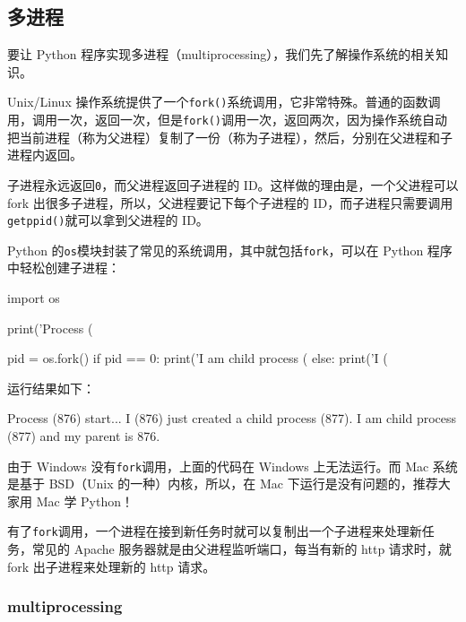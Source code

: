 \hypertarget{ux591aux8fdbux7a0b}{%
\subsection{多进程}\label{ux591aux8fdbux7a0b}}

要让 Python
程序实现多进程（multiprocessing），我们先了解操作系统的相关知识。

Unix/Linux
操作系统提供了一个\texttt{fork()}系统调用，它非常特殊。普通的函数调用，调用一次，返回一次，但是\texttt{fork()}调用一次，返回两次，因为操作系统自动把当前进程（称为父进程）复制了一份（称为子进程），然后，分别在父进程和子进程内返回。

子进程永远返回\texttt{0}，而父进程返回子进程的
ID。这样做的理由是，一个父进程可以 fork
出很多子进程，所以，父进程要记下每个子进程的
ID，而子进程只需要调用\texttt{getppid()}就可以拿到父进程的 ID。

Python
的\texttt{os}模块封装了常见的系统调用，其中就包括\texttt{fork}，可以在
Python 程序中轻松创建子进程：

\begin{pythoncode}
import os

print('Process (%

pid = os.fork()
if pid == 0:
    print('I am child process (%
else:
    print('I (%
\end{pythoncode}

运行结果如下：

\begin{pythoncode}
Process (876) start...
I (876) just created a child process (877).
I am child process (877) and my parent is 876.
\end{pythoncode}

由于 Windows 没有\texttt{fork}调用，上面的代码在 Windows 上无法运行。而
Mac 系统是基于 BSD（Unix 的一种）内核，所以，在 Mac
下运行是没有问题的，推荐大家用 Mac 学 Python！

有了\texttt{fork}调用，一个进程在接到新任务时就可以复制出一个子进程来处理新任务，常见的
Apache 服务器就是由父进程监听端口，每当有新的 http 请求时，就 fork
出子进程来处理新的 http 请求。

\hypertarget{multiprocessing}{%
\subsubsection{multiprocessing}\label{multiprocessing}}

